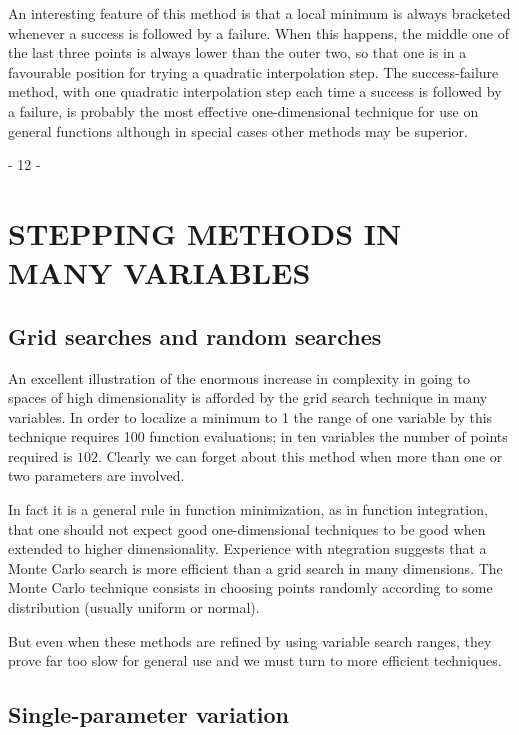      An interesting feature of this method is that a local minimum is
always bracketed whenever a success is followed by a failure.  When this
happens, the middle one of the last three points is always lower than
the outer two, so that one is in a favourable position for trying a
quadratic
interpolation step.  The success-failure method, with one quadratic
interpolation step each time a success is followed by a failure, is
probably
the most effective one-dimensional technique for use on general functions
although in special cases other methods may be superior.
 
 
                                     - 12 -
 \chapter{STEPPING METHODS IN MANY VARIABLES}
  \section{Grid searches and random searches}
        An excellent illustration of the enormous increase in complexity in
   going to spaces of high dimensionality is afforded by the grid search
   technique in many variables.  In order to localize a minimum to 1%
   the range of one variable by this technique requires 100 function
   evaluations;  in ten variables the number of points required is $102$.
   Clearly  we can forget about this method when more than one or two parameters are involved.
 
In fact it is a general rule in function minimization, as in
function integration, that one should not expect good one-dimensional
techniques to be good when extended to higher dimensionality. Experience
with ntegration suggests that a Monte Carlo search is more efficient
than a grid search in many dimensions. The Monte Carlo technique
consists in
choosing points randomly according to some distribution
   (usually uniform or normal).
 
        But even when these methods are refined by using variable search
   ranges, they prove far too slow for general use and we must turn to more
   efficient techniques.
 
 \section{Single-parameter variation}
 
